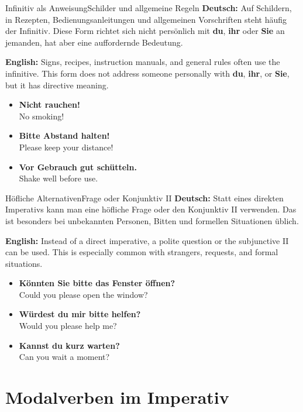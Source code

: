 \documentclass[a4paper,11pt]{article}
\newcommand{\GermanText}[1]{\textbf{Deutsch: }#1\par}
\newcommand{\EnglishText}[1]{{\small\color{SoftGray}\textbf{English: }#1\par}}
\newcommand{\ExampleItem}[2]{\item \textbf{#1}\\{\small\color{SoftGray}#2}}
\begin{document}
        \begin{grammarentry}{Infinitiv als Anweisung}{Schilder und allgemeine Regeln}
            \GermanText{Auf Schildern, in Rezepten, Bedienungsanleitungen und allgemeinen Vorschriften steht häufig der Infinitiv. Diese Form richtet sich nicht persönlich mit \textbf{du}, \textbf{ihr} oder \textbf{Sie} an jemanden, hat aber eine auffordernde Bedeutung.}
            \EnglishText{Signs, recipes, instruction manuals, and general rules often use the infinitive. This form does not address someone personally with \textbf{du}, \textbf{ihr}, or \textbf{Sie}, but it has directive meaning.}
        \end{grammarentry}

        \begin{exbox}
            \begin{itemize}
                \ExampleItem{Nicht rauchen!}{No smoking!}
                \ExampleItem{Bitte Abstand halten!}{Please keep your distance!}
                \ExampleItem{Vor Gebrauch gut schütteln.}{Shake well before use.}
            \end{itemize}
        \end{exbox}

        \begin{grammarentry}{Höfliche Alternativen}{Frage oder Konjunktiv II}
            \GermanText{Statt eines direkten Imperativs kann man eine höfliche Frage oder den Konjunktiv II verwenden. Das ist besonders bei unbekannten Personen, Bitten und formellen Situationen üblich.}
            \EnglishText{Instead of a direct imperative, a polite question or the subjunctive II can be used. This is especially common with strangers, requests, and formal situations.}
        \end{grammarentry}

        \begin{exbox}
            \begin{itemize}
                \ExampleItem{Könnten Sie bitte das Fenster öffnen?}{Could you please open the window?}
                \ExampleItem{Würdest du mir bitte helfen?}{Would you please help me?}
                \ExampleItem{Kannst du kurz warten?}{Can you wait a moment?}
            \end{itemize}
        \end{exbox}

    \section{Modalverben im Imperativ}
\end{document}
